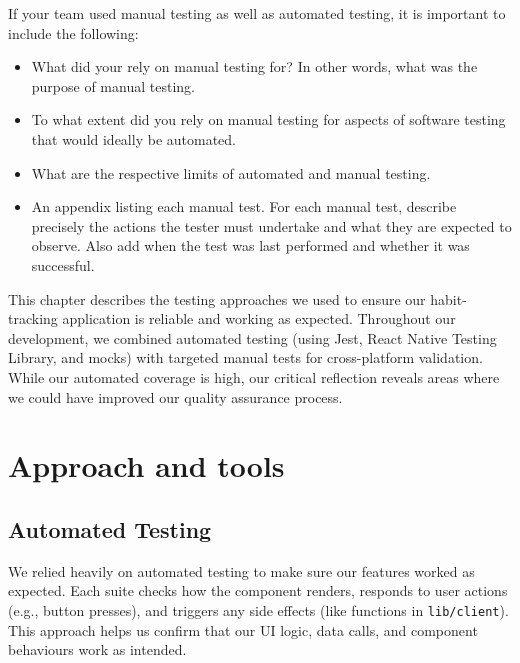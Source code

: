 \begin{expectations}
If your team used manual testing as well as automated testing, it is important to include the following:
\begin{itemize}
\item What did your rely on manual testing for?  In other words, what was the purpose of manual testing.
\item To what extent did you rely on manual testing for aspects of software testing that would ideally be automated.
\item What are the respective limits of automated and manual testing.
\item An appendix listing each manual test.  For each manual test, describe precisely the actions the tester must undertake and what they are expected to observe.  Also add when the test was last performed and whether it was successful.
\end{itemize}
\end{expectations}



This chapter describes the testing approaches we used to ensure our habit-tracking application is reliable and working as expected. Throughout our development, we combined automated testing (using Jest, React Native Testing Library, and mocks) with targeted manual tests for cross-platform validation. While our automated coverage is high, our critical reflection reveals areas where we could have improved our quality assurance process.

\section{Approach and tools} \label{sect:testing:approach}

\subsection{Automated Testing}

We relied heavily on automated testing to make sure our features worked as expected. Each suite checks how the component renders, responds to user actions (e.g., button presses), and triggers any side effects (like functions in \texttt{lib/client}). This approach helps us confirm that our UI logic, data calls, and component behaviours work as intended.

